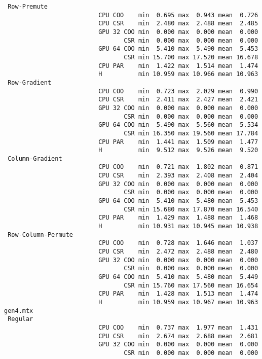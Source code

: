 \begin{verbatim}
 Row-Premute
                          CPU COO    min  0.695 max  0.943 mean  0.726
                          CPU CSR    min  2.480 max  2.488 mean  2.485
                          GPU 32 COO min  0.000 max  0.000 mean  0.000
                                 CSR min  0.000 max  0.000 mean  0.000
                          GPU 64 COO min  5.410 max  5.490 mean  5.453
                                 CSR min 15.700 max 17.520 mean 16.678
                          CPU PAR    min  1.422 max  1.514 mean  1.474
                          H          min 10.959 max 10.966 mean 10.963
 Row-Gradient
                          CPU COO    min  0.723 max  2.029 mean  0.990
                          CPU CSR    min  2.411 max  2.427 mean  2.421
                          GPU 32 COO min  0.000 max  0.000 mean  0.000
                                 CSR min  0.000 max  0.000 mean  0.000
                          GPU 64 COO min  5.490 max  5.560 mean  5.534
                                 CSR min 16.350 max 19.560 mean 17.784
                          CPU PAR    min  1.441 max  1.509 mean  1.477
                          H          min  9.512 max  9.526 mean  9.520
 Column-Gradient
                          CPU COO    min  0.721 max  1.802 mean  0.871
                          CPU CSR    min  2.393 max  2.408 mean  2.404
                          GPU 32 COO min  0.000 max  0.000 mean  0.000
                                 CSR min  0.000 max  0.000 mean  0.000
                          GPU 64 COO min  5.410 max  5.480 mean  5.453
                                 CSR min 15.680 max 17.870 mean 16.540
                          CPU PAR    min  1.429 max  1.488 mean  1.468
                          H          min 10.931 max 10.945 mean 10.938
 Row-Column-Permute
                          CPU COO    min  0.728 max  1.646 mean  1.037
                          CPU CSR    min  2.472 max  2.488 mean  2.480
                          GPU 32 COO min  0.000 max  0.000 mean  0.000
                                 CSR min  0.000 max  0.000 mean  0.000
                          GPU 64 COO min  5.410 max  5.480 mean  5.449
                                 CSR min 15.760 max 17.560 mean 16.654
                          CPU PAR    min  1.428 max  1.513 mean  1.474
                          H          min 10.959 max 10.967 mean 10.963
gen4.mtx
 Regular
                          CPU COO    min  0.737 max  1.977 mean  1.431
                          CPU CSR    min  2.674 max  2.688 mean  2.681
                          GPU 32 COO min  0.000 max  0.000 mean  0.000
                                 CSR min  0.000 max  0.000 mean  0.000

\end{verbatim}

